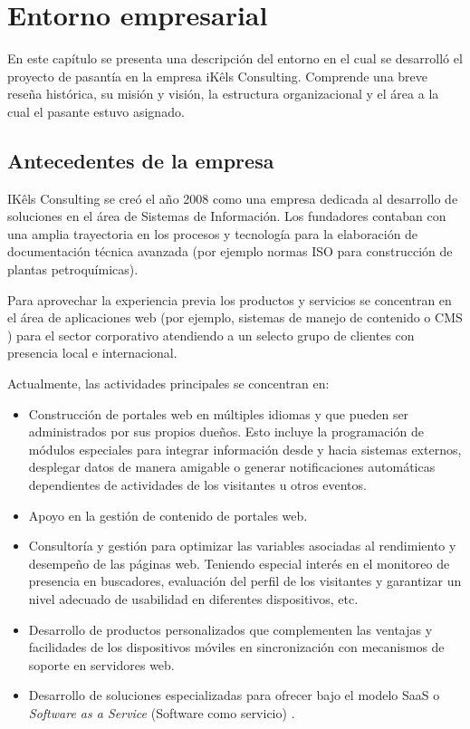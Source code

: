 \chapter{Entorno empresarial} \label{empresa}
En este capítulo se presenta una descripción del entorno en el cual se desarrolló el proyecto de pasantía en la empresa iKêls Consulting. Comprende una breve reseña histórica, su misión y visión, la estructura organizacional y el área a la cual el pasante estuvo asignado.

\section{Antecedentes de la empresa}
IKêls Consulting \cite{ikels} se creó el año 2008 como una empresa dedicada al desarrollo de soluciones en el área de Sistemas de Información. Los fundadores contaban con una amplia trayectoria en los procesos y tecnología para la elaboración de documentación técnica avanzada (por ejemplo normas ISO para construcción de plantas petroquímicas).

Para aprovechar la experiencia previa los productos y servicios se concentran en el área de aplicaciones web (por ejemplo, sistemas de manejo de contenido o CMS \cite{cmsBarker}) para el sector corporativo atendiendo a un selecto grupo de clientes con presencia local e internacional.

Actualmente, las actividades principales se concentran en:

\begin{itemize}
  \item Construcción de portales web en múltiples idiomas y que pueden ser administrados por sus propios dueños. Esto incluye la programación de módulos especiales para integrar información desde y hacia sistemas externos, desplegar datos de manera amigable o generar notificaciones automáticas dependientes de actividades de los visitantes u otros eventos.
  \item Apoyo en la gestión de contenido de portales web.
  \item Consultoría y gestión para optimizar las variables asociadas al rendimiento y desempeño de las páginas web. Teniendo especial interés en el monitoreo de presencia en buscadores, evaluación del perfil de los visitantes y garantizar un nivel adecuado de usabilidad en diferentes dispositivos, etc.
  \item Desarrollo de productos personalizados que complementen las ventajas y facilidades de los dispositivos móviles en sincronización con mecanismos de soporte en servidores web.
  \item Desarrollo de soluciones especializadas para ofrecer bajo el modelo SaaS o \textit{Software as a Service} (Software como servicio) \cite{saas}.
\end{itemize}

